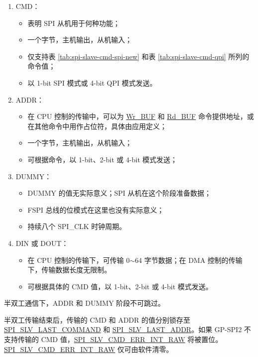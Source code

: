 \documentclass[main\_\_CN.tex]{subfiles}
\begin{document}
\begin{enumerate} 
   \item CMD： 
        \begin{itemize}
            \item 表明 SPI 从机用于何种功能； 
            \item 一个字节，主机输出，从机输入； 
            \item 仅支持表 \ref{tab:spi-slave-cmd-spi-new} 和表 \ref{tab:spi-slave-cmd-qpi} 所列的命令值；
            \item 以 1-bit SPI 模式或 4-bit QPI 模式发送。
        \end{itemize}
    
   \item ADDR： 
        \begin{itemize}
            \item 在 CPU 控制的传输中，可以为  \hyperlink{cmd:wrbuf}{Wr\_BUF} 和  \hyperlink{cmd:rdbuf}{Rd\_BUF} 命令提供地址，或在其他命令中用作占位符，具体由应用定义；
            \item 一个字节，主机输出，从机输入；
            \item 可根据命令，以 1-bit、2-bit 或 4-bit 模式发送；
        \end{itemize}
      
   \item DUMMY： 
        \begin{itemize}
            \item DUMMY 的值无实际意义；SPI 从机在这个阶段准备数据；
            \item FSPI 总线的位模式在这里也没有实际意义；
            \item 持续八个 SPI\_CLK 时钟周期。
        \end{itemize}
   
   \item DIN 或 DOUT： 

        \begin{itemize}
            \item 在 CPU 控制的传输下，可传输 0$\sim$64 字节数据；在 DMA 控制的传输下，传输数据长度无限制。
            \item 可根据具体的 CMD 值，以 1-bit、2-bit 或 4-bit 模式发送。
        \end{itemize}
    
   \end{enumerate}

\begin{tiplisting}
半双工通信下，ADDR 和 DUMMY 阶段不可跳过。
\end{tiplisting}
\vspace{-1em}
半双工传输结束后，传输的 CMD 和 ADDR 的值分别锁存至 \hyperref[fielddesc:SPISLVLASTCOMMAND]{SPI\_SLV\_LAST\_COMMAND} 和 \hyperref[fielddesc:SPISLVLASTADDR]{SPI\_SLV\_LAST\_ADDR}。如果 GP-SPI2 不支持传输的 CMD 值，\hyperref[fielddesc:SPISLVCMDERRINTRAW]{SPI\_SLV\_CMD\_ERR\_INT\_RAW} 将被置位。 \hyperref[fielddesc:SPISLVCMDERRINTRAW]{SPI\_SLV\_CMD\_ERR\_INT\_RAW} 仅可由软件清零。
\end{document}
